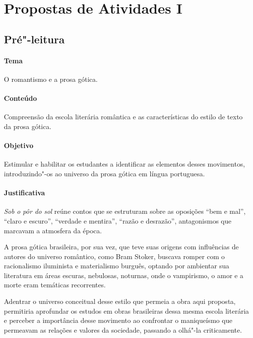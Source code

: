 \documentclass[12pt]{extarticle}
\begin{document}
\tableofcontents

\section{Propostas de Atividades I}


\subsection{Pré"-leitura}


\paragraph{Tema} O romantismo e a prosa gótica.

\paragraph{Conteúdo} Compreensão da escola literária romântica e as 
características do estilo de texto da prosa gótica.

\paragraph{Objetivo} Estimular e habilitar os estudantes a identificar as 
elementos desses movimentos, introduzindo"-os ao universo da prosa gótica
em língua portuguesa.  

\paragraph{Justificativa} \emph{Sob o pôr do sol} reúne contos que se estruturam 
sobre as oposições ``bem e mal'', ``claro e escuro'', ``verdade e mentira'', 
``razão e desrazão'', antagonismos que marcavam a atmosfera da época.

A prosa gótica brasileira, por sua vez, que teve suas origens com influências de autores do
universo romântico, como Bram Stoker, buscava romper com o racionalismo iluminista 
e materialismo burguês, optando por ambientar sua literatura em áreas escuras, nebulosas,
noturnas, onde o vampirismo, o amor e a morte eram temáticas recorrentes. 


Adentrar o universo conceitual desse estilo que permeia a obra aqui proposta, permitiria
aprofundar os estudos em obras brasileiras dessa mesma escola literária e perceber a importância
desse movimento ao confrontar o maniqueísmo que permeavam as relações e valores da sociedade, 
passando a olhá"-la criticamente. 
\end{document}
